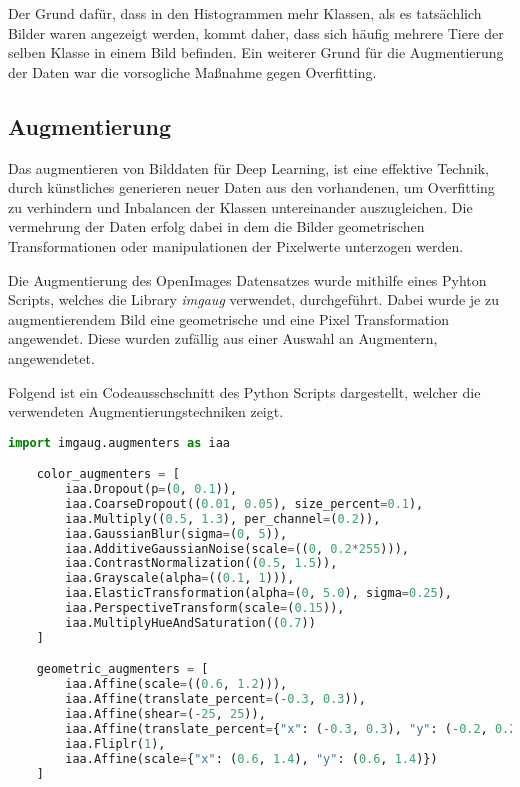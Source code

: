 Der Grund dafür, dass in den Histogrammen mehr Klassen,
als es tatsächlich Bilder 
waren angezeigt werden, kommt daher, dass 
sich häufig mehrere Tiere der selben Klasse in einem Bild 
befinden.
Ein weiterer Grund für die Augmentierung der Daten war 
die vorsogliche Maßnahme gegen Overfitting.




\subsection{Augmentierung}\label{subsec:augmentation}


Das augmentieren von Bilddaten für Deep Learning, 
ist eine effektive Technik, durch künstliches generieren
neuer Daten aus den vorhandenen, um Overfitting zu
verhindern und Inbalancen der Klassen untereinander auszugleichen.
Die vermehrung der Daten erfolg dabei in dem die Bilder 
geometrischen Transformationen oder manipulationen der Pixelwerte 
unterzogen werden.

Die Augmentierung des OpenImages Datensatzes wurde mithilfe 
eines Pyhton Scripts, welches die Library \textit{imgaug} \cite{imgaug}
verwendet, durchgeführt.
Dabei wurde je zu augmentierendem Bild eine geometrische und 
eine Pixel Transformation angewendet.
Diese wurden zufällig aus einer Auswahl an Augmentern, 
angewendetet.

Folgend ist ein Codeausschschnitt des Python Scripts dargestellt, 
welcher die verwendeten Augmentierungstechniken zeigt.


\begin{lstlisting}[language=Python]
    import imgaug.augmenters as iaa

    color_augmenters = [
        iaa.Dropout(p=(0, 0.1)),
        iaa.CoarseDropout((0.01, 0.05), size_percent=0.1),
        iaa.Multiply((0.5, 1.3), per_channel=(0.2)),
        iaa.GaussianBlur(sigma=(0, 5)),
        iaa.AdditiveGaussianNoise(scale=((0, 0.2*255))),
        iaa.ContrastNormalization((0.5, 1.5)),
        iaa.Grayscale(alpha=((0.1, 1))),
        iaa.ElasticTransformation(alpha=(0, 5.0), sigma=0.25),
        iaa.PerspectiveTransform(scale=(0.15)),
        iaa.MultiplyHueAndSaturation((0.7))
    ]

    geometric_augmenters = [
        iaa.Affine(scale=((0.6, 1.2))),
        iaa.Affine(translate_percent=(-0.3, 0.3)),
        iaa.Affine(shear=(-25, 25)),
        iaa.Affine(translate_percent={"x": (-0.3, 0.3), "y": (-0.2, 0.2)}),
        iaa.Fliplr(1),
        iaa.Affine(scale={"x": (0.6, 1.4), "y": (0.6, 1.4)})
    ]
    
\end{lstlisting}

